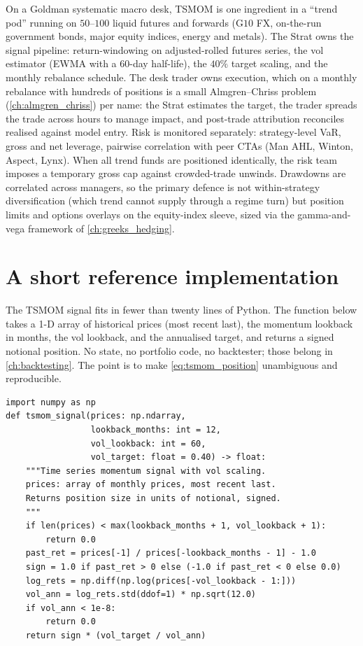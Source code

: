 \begin{gsbox}
\label{gs:tsmom_macro_desk}
On a Goldman systematic macro desk, TSMOM is one ingredient in a
``trend pod'' running on $50$--$100$ liquid futures and forwards
(G$10$ FX, on-the-run government bonds, major equity indices,
energy and metals). The Strat owns the signal pipeline:
return-windowing on adjusted-rolled futures series, the vol
estimator (EWMA with a $60$-day half-life), the $40\%$ target
scaling, and the monthly rebalance schedule. The desk trader owns
execution, which on a monthly rebalance with hundreds of positions
is a small Almgren--Chriss problem (\cref{ch:almgren_chriss}) per
name: the Strat estimates the target, the trader spreads the
trade across hours to manage impact, and post-trade attribution
reconciles realised against model entry. Risk is monitored
separately: strategy-level VaR, gross and net leverage, pairwise
correlation with peer CTAs (Man AHL, Winton, Aspect, Lynx). When
all trend funds are positioned identically, the risk team imposes
a temporary gross cap against crowded-trade unwinds. Drawdowns are
correlated across managers, so the primary defence is not
within-strategy diversification (which trend cannot supply through
a regime turn) but position limits and options overlays on the
equity-index sleeve, sized via the gamma-and-vega framework of
\cref{ch:greeks_hedging}.
\end{gsbox}

\section{A short reference implementation}
\label{sec:ch12_implementation}

The TSMOM signal fits in fewer than twenty lines of Python. The
function below takes a 1-D array of historical prices (most recent
last), the momentum lookback in months, the vol lookback, and the
annualised target, and returns a signed notional position. No
state, no portfolio code, no backtester; those belong in
\cref{ch:backtesting}. The point is to make
\eqref{eq:tsmom_position} unambiguous and reproducible.

\begin{lstlisting}[caption={Time series momentum signal with vol scaling.}]
import numpy as np
def tsmom_signal(prices: np.ndarray,
                 lookback_months: int = 12,
                 vol_lookback: int = 60,
                 vol_target: float = 0.40) -> float:
    """Time series momentum signal with vol scaling.
    prices: array of monthly prices, most recent last.
    Returns position size in units of notional, signed.
    """
    if len(prices) < max(lookback_months + 1, vol_lookback + 1):
        return 0.0
    past_ret = prices[-1] / prices[-lookback_months - 1] - 1.0
    sign = 1.0 if past_ret > 0 else (-1.0 if past_ret < 0 else 0.0)
    log_rets = np.diff(np.log(prices[-vol_lookback - 1:]))
    vol_ann = log_rets.std(ddof=1) * np.sqrt(12.0)
    if vol_ann < 1e-8:
        return 0.0
    return sign * (vol_target / vol_ann)
\end{lstlisting}

